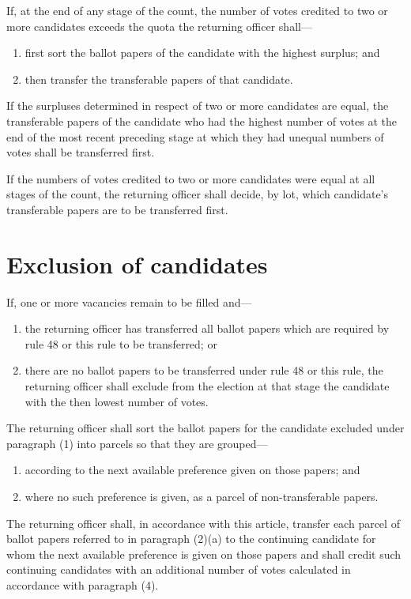 \appnpara If, at the end of any stage of the count, the number of votes credited to two or more candidates exceeds the quota the returning officer shall—
\begin{enumerate}
    \item first sort the ballot papers of the candidate with the highest surplus; and
    \item then transfer the transferable papers of that candidate.
\end{enumerate}


\appnpara If the surpluses determined in respect of two or more candidates are equal, the transferable papers of the candidate who had the highest number of votes at the end of the most recent preceding stage at which they had unequal numbers of votes shall be transferred first.

\appnpara If the numbers of votes credited to two or more candidates were equal at all stages of the count, the returning officer shall decide, by lot, which candidate's transferable papers are to be transferred first.

\section{Exclusion of candidates}

\appnpara If, one or more vacancies remain to be filled and—
\begin{enumerate}
    \item the returning officer has transferred all ballot papers which are required by rule 48 or this rule to be transferred; or
    \item there are no ballot papers to be transferred under rule 48 or this rule, the returning officer shall exclude from the election at that stage the candidate with the then lowest number of votes.
    
\end{enumerate}

\appnpara The returning officer shall sort the ballot papers for the candidate excluded under paragraph (1) into parcels so that they are grouped—
\begin{enumerate}
    \item according to the next available preference given on those papers; and
    \item where no such preference is given, as a parcel of non-transferable papers.
\end{enumerate}

\appnpara The returning officer shall, in accordance with this article, transfer each parcel of ballot papers referred to in paragraph (2)(a) to the continuing candidate for whom the next available preference is given on those papers and shall credit such continuing candidates with an additional number of votes calculated in accordance with paragraph (4).


